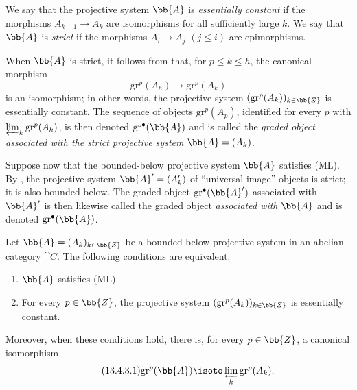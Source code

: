 \begin{env}[13.4.2]
\label{0.13.4.2}
We say that the projective system $\bb{A}$ is
\emph{essentially constant} if the morphisms
$A_{k+1}\longrightarrow A_k$ are isomorphisms for all sufficiently
large $k$.
We say that $\bb{A}$ is \emph{strict} if the morphisms
$A_i\longrightarrow A_j$ $(j\leq i)$ are epimorphisms.

When $\bb{A}$ is strict, it follows from  that, for
$p\leq k\leq h$, the canonical morphism
\[
  \mathrm{gr}^p(A_h)\longrightarrow\mathrm{gr}^p(A_k)
\]
is an isomorphism; in other words, the projective system
$(\mathrm{gr}^p(A_k))_{k\in\bb{Z}}$ is essentially constant.
The sequence of objects $\mathrm{gr}^p(A_p)$, identified for every
$p$ with $\varprojlim_k\mathrm{gr}^p(A_k)$, is then denoted
$\mathrm{gr}^\bullet(\bb{A})$ and is called the
\emph{graded object associated with the strict projective system}
$\bb{A}=(A_k)$.

Suppose now that the bounded-below projective system $\bb{A}$
satisfies (ML).
By , the projective system
$\bb{A}'=(A'_k)$ of ``universal image'' objects is strict; it is also
bounded below.
The graded object $\mathrm{gr}^\bullet(\bb{A}')$ associated with
$\bb{A}'$ is then likewise called the graded object
\emph{associated with} $\bb{A}$ and is denoted
$\mathrm{gr}^\bullet(\bb{A})$.
\end{env}

\begin{proposition}[13.4.3]
\label{0.13.4.3}
Let $\bb{A}=(A_k)_{k\in\bb{Z}}$ be a bounded-below projective system
in an abelian category $\cat{C}$.
The following conditions are equivalent:
\begin{enumerate}
  \item[{\rm a)}] $\bb{A}$ satisfies (ML).
  \item[{\rm b)}] For every $p\in\bb{Z}$, the projective system
  $(\mathrm{gr}^p(A_k))_{k\in\bb{Z}}$ is essentially constant.
\end{enumerate}
Moreover, when these conditions hold, there is, for every
$p\in\bb{Z}$, a canonical isomorphism
\begin{equation}
\label{0.13.4.3.1}
\tag{13.4.3.1}
  \mathrm{gr}^p(\bb{A})
  \isoto
  \varprojlim_k\mathrm{gr}^p(A_k).
\end{equation}
\end{proposition}

